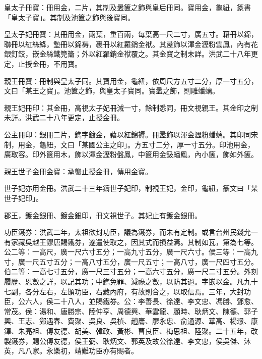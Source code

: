 皇太子冊寶：冊用金，二片，其制及盝篋之飾與皇后冊同。寶用金，龜紐，篆書「皇太子寶」。其制及池篋之飾與後寶同。

皇太子妃冊寶：其冊用金，兩葉，重百兩，每葉高一尺二寸，廣五寸。藉冊以錦，聯冊以紅絲絳，墊冊以錦褥，裹冊以紅羅銷金袱。其盝飾以渾金瀝粉雲鳳，內有花銀釘鉸，嵌金絲鐵筦籥；外以紅羅銷金袱覆之。其金寶之制未詳。洪武二十八年更定，止授金冊，不用寶。

親王冊寶：冊制與皇太子同。其寶用金，龜紐，依周尺方五寸二分，厚一寸五分，文曰「某王之寶」。池篋之飾，與皇太子寶同。寶盝之飾，則雕蟠螭。

親王妃冊印：其金冊，高視太子妃冊減一寸，餘制悉同，冊文視親王。其金印之制未詳。洪武二十八年更定，止授金冊。

公主冊印：銀冊二片，鐫字鍍金，藉以紅錦褥。冊盝飾以渾金瀝粉蟠螭。其印同宋制，用金，龜紐，文曰「某國公主之印」。方五寸二分，厚一寸五分。印池用金，廣取容。印外篋用木，飾以渾金瀝粉盤鳳，中篋用金鈒蟠鳳，內小篋，飾如外篋。

親王世子金冊金寶：承襲止授金冊，傳用金寶。

世子妃亦用金冊。洪武二十三年鑄世子妃印，制視王妃，金印，龜紐，篆文曰「某世子妃印」。

郡王，鍍金銀冊、鍍金銀印，冊文視世子。其妃止有鍍金銀冊。

功臣鐵券：洪武二年，太祖欲封功臣，議為鐵券，而未有定制。或言台州民錢允一有家藏吳越王鏐唐賜鐵券，遂遣使取之，因其式而損益焉。其制如瓦，第為七等。公二等：一高尺，廣一尺六寸五分；一高九寸五分，廣一尺六寸。侯三等：一高九寸，廣一尺五寸五分；一高八寸五分，廣一尺五寸；一高八寸，廣一尺四寸五分。伯二等：一高七寸五分，廣一尺三寸五分；一高六寸五分，廣一尺二寸五分。外刻履歷、恩數之詳，以記其功；中鐫免罪、減祿之數，以防其過。字嵌以金。凡九十七副，各分左右，左頒功臣，右藏內府，有故則合之，以取信焉。三年，大封功臣，公六人，侯二十八人，並賜鐵券。公：李善長、徐達、李文忠、馮勝、鄧愈、常茂。侯：湯和、唐勝宗、陸仲亨、周德興、華雲龍、顧時、耿炳文、陳德、郭子興、王志、鄭遇春、費聚、吳良、吳楨、趙庸、廖永忠、俞通源、華高、楊璟、康鐸、朱亮祖、傅友德、胡美、韓政、黃彬、曹良臣、梅思祖、陸聚。二十五年，改製鐵券，賜公傅友德，侯王弼、耿炳文、郭英及故公徐達、李文忠，侯吳傑、沐英，凡八家。永樂初，靖難功臣亦有賜者。

